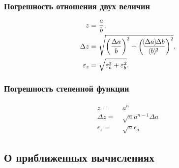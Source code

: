 \documentclass[a4paper, 12pt]{extarticle}
\newcommand{\eps}{\epsilon}
\begin{document}



\subsubsection{Погрешность отношения двух величин}
\vspace{-0.75cm}
\begin{align} \label{eq:div-error}
\begin{split}
z = &\ \frac{a}{b}, \\
\Delta z =&\  \sqrt{\left(\frac{\Delta a}{b}\right)^2 + \left(\frac{\MTDMean{\Delta a} \Delta b}{\MTDMean{b}^2} \right)^2}, \\
\eps_{z} =&\ \sqrt{\eps_a^2 + \eps_b^2}.
\end{split}
\end{align}

\subsubsection{Погрешность степенной функции}
\vspace{-0.75cm}
\begin{align} \label{eq:pow-error}
\begin{split}
z =&\  a^n \\
\Delta z =&\  \sqrt{n} a^{n - 1}\Delta a \\
\eps_z =&\  \sqrt{n}\eps_a
\end{split}
\end{align}


\subsection{О приближенных вычислениях}
\end{document}

